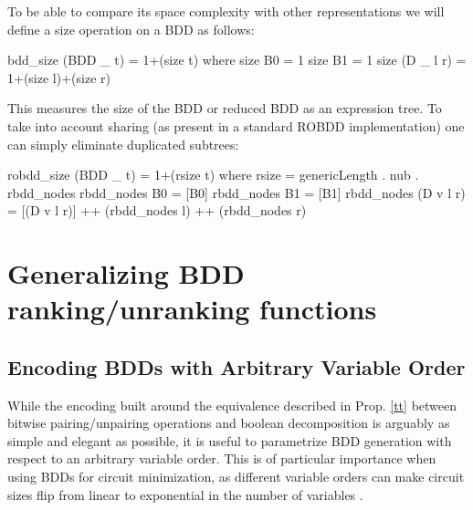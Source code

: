 \documentclass[]{INCLUDES/llncs}
\begin{document}
To be able to compare its space complexity
with other representations we will define 
a size operation on a BDD as follows:
\begin{code}
bdd_size (BDD _ t) = 1+(size t) where
  size B0 = 1
  size B1 = 1
  size (D _ l r) = 1+(size l)+(size r)
\end{code}
This measures the size of the BDD or reduced BDD as an expression tree.
To take into account sharing (as present in a standard ROBDD implementation)
one can simply eliminate duplicated subtrees:
\begin{code}
robdd_size (BDD _ t) = 1+(rsize t) where
  rsize = genericLength . nub . rbdd_nodes
  rbdd_nodes B0 = [B0]
  rbdd_nodes B1 = [B1]
  rbdd_nodes (D v l r) = 
    [(D v l r)] ++ (rbdd_nodes l) ++ (rbdd_nodes r)
\end{code}

\section{Generalizing BDD ranking/unranking functions}

\subsection{Encoding BDDs with Arbitrary Variable Order}
While the encoding built around the equivalence described in Prop. \ref{tt}
between bitwise pairing/unpairing operations and boolean decomposition
is arguably as simple and elegant as possible, it is useful
to parametrize BDD generation with respect to an arbitrary
variable order. This is of particular importance when using
BDDs for circuit minimization, as different variable orders
can make circuit sizes flip from linear to exponential in
the number of variables \cite{bryant86graphbased}.
\end{document}
